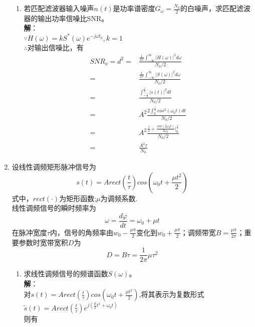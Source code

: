 \documentclass{article}
\begin{document}
\begin{enumerate}[1.]
\begin{enumerate}[(1)]
\item 若匹配滤波器输入噪声$n(t)$是功率谱密度$G_{\omega}=\frac{N_{0}}{2}$的白噪声，求匹配滤波器的输出功率信噪比SNR。\\
\textbf{解}：\\
\(\because H(\omega)= kS^{*}(\omega)e^{-j\omega t_{0}} , k=1\)\\
\(\therefore\)对输出信噪比，有
\begin{equation*}%
\begin{split}
SNR_{o}=d^{2} =& \frac { \frac{1}{2\pi} \int_{-\infty}^{\infty} |H(\omega)|^{2} d\omega } { N_{0}/2 } \\
	   =& \frac { \frac{1}{2\pi} \int_{-\infty}^{\infty} |S(\omega)|^{2} d\omega } { N_{0}/2 } \\
	   =& \frac { \int_{- \frac{\tau}{2}}^{ \frac{\tau}{2}} |s(t)|^{2} dt } { N_{0}/2 } \\
	   =& A^{2}\frac { 2\int_{0}^{ \frac{\tau}{2}} cos^{2}(\omega_{0}t) dt } { N_{0}/2 } \\
	   =& A^{2}\frac { \frac{\tau }{2}+\frac{ sin(2\omega_{0}t) }{2\omega_{0}}|_{0}^{\frac{\tau}{2}} }{N_{0}/2 }\\
	   =& \frac{A^{2}\tau}{N_{0}}
\end{split}
\end{equation*}
\end{enumerate}

\item 
设线性调频矩形脉冲信号为$$s(t)=Arect(\frac{t}{\tau})cos(\omega_{0}t+\frac{\mu t^{2}}{2})$$
\qquad 式中，$rect(\cdot)$为矩形函数;\(\mu\)为调频系数.$$$$%
\qquad 线性调频信号的瞬时频率为$$\omega=\frac{d\varphi}{dt}=\omega_{0}+\mu t$$
\qquad 在脉冲宽度\(\tau\)内，信号的角频率由$w_{0}-\frac{\mu \pi}{2}$变化到$w_{0}+\frac{\mu \pi}{2}$；调频带宽$B=\frac{\mu\pi}{2\pi}$；重要参数时宽带宽积$D$为$$D=B\tau=\frac{1}{2\pi}\mu\tau^{2}$$

\begin{enumerate}[(1)]
\item 求线性调频信号的频谱函数$S(\omega)$。\\
\textbf{解}：\\
对$s(t)=Arect(\frac{t}{\tau})cos(\omega_{0}t+\frac{\mu t^{2}}{2})$,将其表示为复数形式$\widetilde{s}(t)=Arect(\frac{t}{\tau})e^{j(\frac{\mu}{2}t^{2}+\omega_{0}t)}$\\
则有


\end{enumerate}
\end{enumerate}
\end{document}
